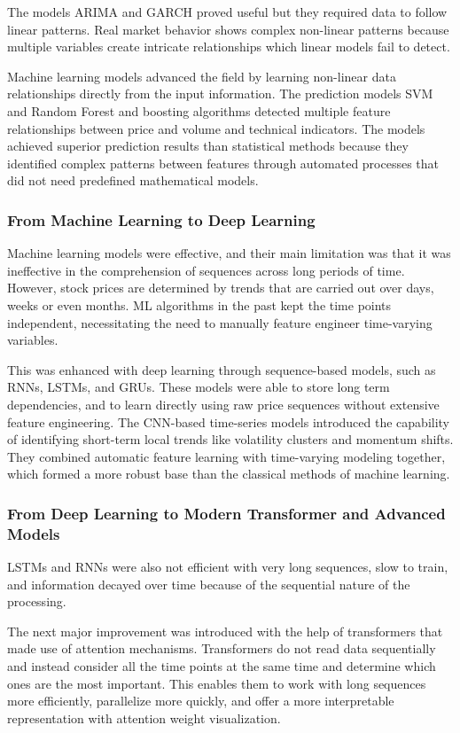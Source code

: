 The models ARIMA and GARCH proved useful but they required data to follow linear patterns. Real market behavior shows complex non-linear patterns because multiple variables create intricate relationships which linear models fail to detect.

Machine learning models advanced the field by learning non-linear data relationships directly from the input information. The prediction models SVM and Random Forest and boosting algorithms detected multiple feature relationships between price and volume and technical indicators. The models achieved superior prediction results than statistical methods because they identified complex patterns between features through automated processes that did not need predefined mathematical models.

\subsubsection{From Machine Learning to Deep Learning}

Machine learning models were effective, and their main limitation was that it was ineffective in the comprehension of sequences across long periods of time. However, stock prices are determined by trends that are carried out over days, weeks or even months. ML algorithms in the past kept the time points independent, necessitating the need to manually feature engineer time-varying variables.

This was enhanced with deep learning through sequence-based models, such as RNNs, LSTMs, and GRUs. These models were able to store long term dependencies, and to learn directly using raw price sequences without extensive feature engineering. The CNN-based time-series models introduced the capability of identifying short-term local trends like volatility clusters and momentum shifts. They combined automatic feature learning with time-varying modeling together, which formed a more robust base than the classical methods of machine learning.

\subsubsection{From Deep Learning to Modern Transformer and Advanced Models}

LSTMs and RNNs were also not efficient with very long sequences, slow to train, and information decayed over time because of the sequential nature of the processing.

The next major improvement was introduced with the help of transformers that made use of attention mechanisms. Transformers do not read data sequentially and instead consider all the time points at the same time and determine which ones are the most important. This enables them to work with long sequences more efficiently, parallelize more quickly, and offer a more interpretable representation with attention weight visualization.

